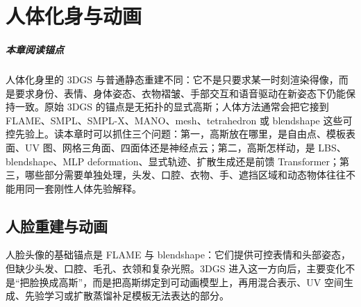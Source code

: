 \chapter{人体化身与动画}

\paragraph*{本章阅读锚点}
人体化身里的 3DGS 与普通静态重建不同：它不是只要求某一时刻渲染得像，而是要求身份、表情、身体姿态、衣物褶皱、手部交互和语音驱动在新姿态下仍能保持一致。原始 3DGS 的锚点是无拓扑的显式高斯；人体方法通常会把它接到 FLAME、SMPL、SMPL-X、MANO、mesh、tetrahedron 或 blendshape 这些可控先验上。读本章时可以抓住三个问题：第一，高斯放在哪里，是自由点、模板表面、UV 图、网格三角面、四面体还是神经点云；第二，高斯怎样动，是 LBS、blendshape、MLP deformation、显式轨迹、扩散生成还是前馈 Transformer；第三，哪些部分需要单独处理，头发、口腔、衣物、手、遮挡区域和动态物体往往不能用同一套刚性人体先验解释。

\section{人脸重建与动画}

人脸头像的基础锚点是 FLAME 与 blendshape：它们提供可控表情和头部姿态，但缺少头发、口腔、毛孔、衣领和复杂光照。3DGS 进入这一方向后，主要变化不是“把脸换成高斯”，而是把高斯绑定到可动画模型上，再用混合表示、UV 空间生成、先验学习或扩散蒸馏补足模板无法表达的部分。



